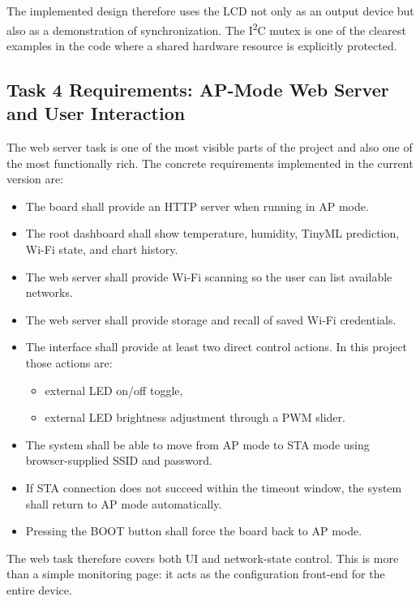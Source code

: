 The implemented design therefore uses the LCD not only as an output device but
also as a demonstration of synchronization. The I\textsuperscript{2}C mutex is
one of the clearest examples in the code where a shared hardware resource is
explicitly protected.

\subsection{Task 4 Requirements: AP-Mode Web Server and User Interaction}
The web server task is one of the most visible parts of the project and also
one of the most functionally rich. The concrete requirements implemented in the
current version are:
\begin{itemize}
  \item The board shall provide an HTTP server when running in AP mode.
  \item The root dashboard shall show temperature, humidity, TinyML prediction,
  Wi-Fi state, and chart history.
  \item The web server shall provide Wi-Fi scanning so the user can list
  available networks.
  \item The web server shall provide storage and recall of saved Wi-Fi
  credentials.
  \item The interface shall provide at least two direct control actions. In
  this project those actions are:
  \begin{itemize}
    \item external LED on/off toggle,
    \item external LED brightness adjustment through a PWM slider.
  \end{itemize}
  \item The system shall be able to move from AP mode to STA mode using
  browser-supplied SSID and password.
  \item If STA connection does not succeed within the timeout window, the
  system shall return to AP mode automatically.
  \item Pressing the BOOT button shall force the board back to AP mode.
\end{itemize}

The web task therefore covers both UI and network-state control. This is more
than a simple monitoring page: it acts as the configuration front-end for the
entire device.

